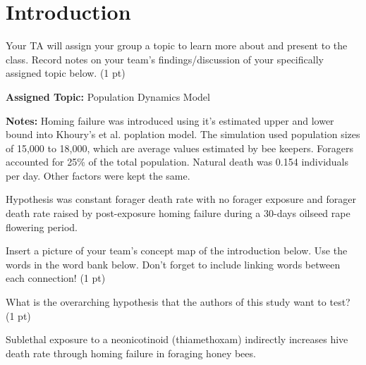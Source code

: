 \documentclass[12pt,a4paper]{article}
\begin{document}
\section*{Introduction}
\begin{enumerate}[font=\bfseries, wide]
    {\color{under}\item Your TA will assign your group a topic to learn more about and present to the class. Record notes on your team’s findings/discussion of your specifically assigned topic below. (1 pt)}
    
    \textbf{Assigned Topic:} Population Dynamics Model

    \textbf{Notes:} Homing failure was introduced using it's estimated upper and lower bound into Khoury's et al. poplation model. The simulation used population sizes of 15,000 to 18,000, which are average values estimated by bee keepers. Foragers accounted for 25\% of the total population. Natural death was 0.154 individuals per day. Other factors were kept the same. 

    Hypothesis was constant forager death rate with no forager exposure and forager death rate raised by post-exposure homing failure during a 30-days oilseed rape flowering period. 
    
    {\color{under}\item Insert a picture of your team’s concept map of the introduction below. Use the words in the word bank below. Don’t forget to include linking words between each connection!   (1 pt)}
    
    
    {\color{under}\item What is the overarching hypothesis that the authors of this study want to test? (1 pt)}
    
    Sublethal exposure to a neonicotinoid (thiamethoxam) indirectly increases hive death rate through homing failure in foraging honey bees.
    
\end{enumerate}
\end{document}
